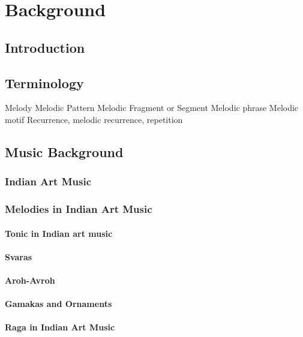 
\chapter{Background}
\label{chap:background}

\section{Introduction}

\section{Terminology}

Melody
Melodic Pattern
Melodic Fragment or Segment
Melodic phrase
Melodic motif
Recurrence, melodic recurrence, repetition

\section{Music Background}
\label{sec:music_background}

\subsection{Indian Art Music}

\subsection{Melodies in Indian Art Music}

\subsubsection{Tonic in Indian art music}

\subsubsection{Svaras}

\subsubsection{Aroh-Avroh}

\subsubsection{Gamakas and Ornaments}

\subsubsection{Raga in Indian Art Music}

